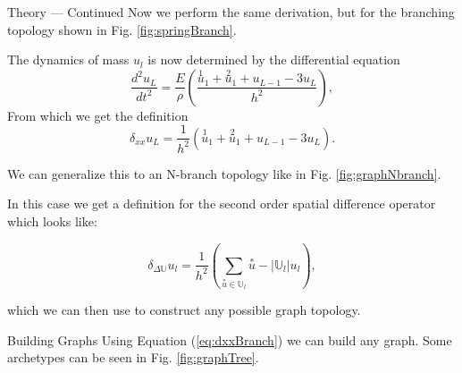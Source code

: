 \documentclass[a0paper,portrait]{baposter}
\begin{document}
\begin{poster}
\begin{posterbox}[name=theory2,column=1]{Theory --- Continued}
Now we perform the same derivation, but for the branching topology shown in Fig. \ref{fig:springBranch}.
\begin{center}
    {
        
    }
    \label{fig:springBranch}
\end{center}
The dynamics of mass $u_l$ is now determined by the differential equation
\begin{equation}
    \frac{d^2u_L}{dt^2} = \frac{E}{\rho}\left(\frac{\overset{1}{u}_{1} + \overset{2}{u}_{1} + u_{L-1} - 3u_{L}}{h^2} \right),
\end{equation}
From which we get the definition
\begin{equation}
    \delta_{xx}u_L = \frac{1}{h^2}(\overset{1}{u}_{1} + \overset{2}{u}_{1} + u_{L-1} - 3u_{L}).
\end{equation}

We can generalize this to an N-branch topology like in Fig.  \ref{fig:graphNbranch}.

\begin{center}
    {
        
    }
    \label{fig:graphNbranch}
\end{center}

In this case we get a definition for the second order spatial difference operator which looks like:

\begin{equation}
    \label{eq:dxxBranch}
    \delta_{\Delta\mathbb{U}}u_l = \frac{1}{h^2}\left(\sum_{\overset{*}{u} \in
    \mathbb{U}_l} \overset{*}{u} - |\mathbb{U}_l| u_l\right),
\end{equation}

which we can then use to construct any possible graph topology.

\end{posterbox}

\begin{posterbox}[name=buildinggraphs,column=1,below=theory2]{Building Graphs}
Using Equation (\ref{eq:dxxBranch}) we can build any graph. Some archetypes
can be seen in Fig. \ref{fig:graphTree}.


\end{posterbox}
\end{poster}
\end{document}
